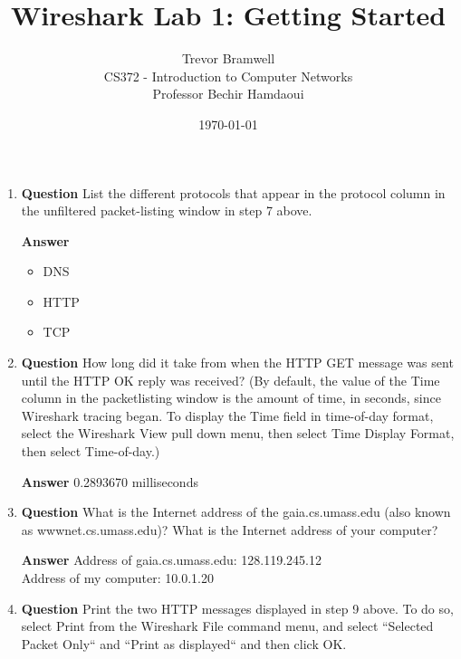 \documentclass[12pt,letterpaper]{article}
\title{Wireshark Lab 1: Getting Started}
\author{
    Trevor Bramwell \\
    CS372 - Introduction to Computer Networks \\
    Professor Bechir Hamdaoui
}
\date{\today}
\newcommand{\q}{\textbf{Question} }
\newcommand{\ans}{\textbf{Answer} }
\begin{document}
\maketitle

\begin{enumerate}
\item \q List the different protocols that appear in the protocol column in 
    the unfiltered 
    packet-listing window in step 7 above. 

\ans 
\begin{itemize}
    \item DNS
    \item HTTP
    \item TCP
\end{itemize}

\item \q How long did it take from when the HTTP GET message was sent until
    the HTTP OK reply was received? (By default, the value of the Time column
    in the packetlisting window is the amount of time, in seconds, since
    Wireshark tracing began. To display the Time field in time-of-day format,
    select the Wireshark View pull down menu, then select Time Display Format,
    then select Time-of-day.)

\ans 0.2893670 milliseconds

\item \q What is the Internet address of the gaia.cs.umass.edu (also known \\
as wwwnet.cs.umass.edu)?  What is the Internet address of your computer? 

\ans Address of gaia.cs.umass.edu: 128.119.245.12 \\
     Address of my computer: 10.0.1.20

\item \q Print the two HTTP messages displayed in step 9 above. To do so,
    select Print from the Wireshark File command menu, and select ``Selected
    Packet Only`` and ``Print as displayed`` and then click OK.

\pagebreak

\pagebreak


\end{enumerate}
\end{document}
